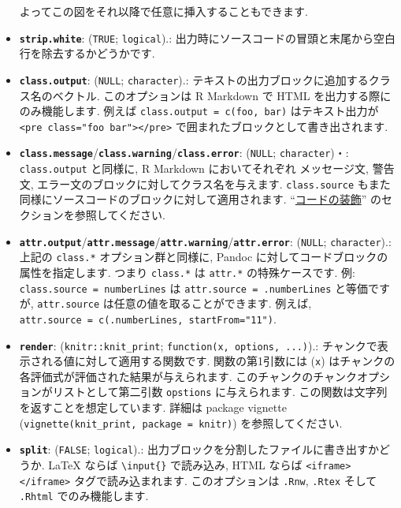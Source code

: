 \documentclass[
]{bxjsreport}
\begin{document}
\begin{itemize}
  よってこの図をそれ以降で任意に挿入することもできます.
\item
  \textbf{\texttt{strip.white}}: (\texttt{TRUE}; \texttt{logical}).:
  出力時にソースコードの冒頭と末尾から空白行を除去するかどうかです.
\item
  \textbf{\texttt{class.output}}: (\texttt{NULL}; \texttt{character}).:
  テキストの出力ブロックに追加するクラス名のベクトル. このオプションは R
  Markdown で HTML を出力する際にのみ機能します. 例えば
  \texttt{class.output\ =\ c(\textquotesingle{}foo\textquotesingle{},\ \textquotesingle{}bar\textquotesingle{})}
  はテキスト出力が
  \texttt{\textless{}pre\ class="foo\ bar"\textgreater{}\textless{}/pre\textgreater{}}
  で囲まれたブロックとして書き出されます.
\item
  \textbf{\texttt{class.message}}/\textbf{\texttt{class.warning}}/\textbf{\texttt{class.error}}:
  (\texttt{NULL}; \texttt{character})・: \texttt{class.output} と同様に,
  R Markdown においてそれぞれ メッセージ文, 警告文,
  エラー文のブロックに対してクラス名を与えます. \texttt{class.source}
  もまた同様にソースコードのブロックに対して適用されます.
  ``\protect\hyperlink{code-decoration}{コードの装飾}''
  のセクションを参照してください.
\item
  \textbf{\texttt{attr.output}}/\textbf{\texttt{attr.message}}/\textbf{\texttt{attr.warning}}/\textbf{\texttt{attr.error}}:
  (\texttt{NULL}; \texttt{character}).: 上記の \texttt{class.*}
  オプション群と同様に, Pandoc に対してコードブロックの属性を指定します.
  つまり \texttt{class.*} は \texttt{attr.*} の特殊ケースです. 例:
  \texttt{class.source\ =\ \textquotesingle{}numberLines\textquotesingle{}}
  は
  \texttt{attr.source\ =\ \textquotesingle{}.numberLines\textquotesingle{}}
  と等価ですが, \texttt{attr.source} は任意の値を取ることができます.
  例えば,
  \texttt{attr.source\ =\ c(\textquotesingle{}.numberLines\textquotesingle{},\ \textquotesingle{}startFrom="11"\textquotesingle{})}.
\item
  \textbf{\texttt{render}}: (\texttt{knitr::knit\_print};
  \texttt{function(x,\ options,\ ...)}).:
  チャンクで表示される値に対して適用する関数です. 関数の第1引数には
  (\texttt{x}) はチャンクの各評価式が評価された結果が与えられます.
  このチャンクのチャンクオプションがリストとして第二引数
  \texttt{opstions} に与えられます.
  この関数は文字列を返すことを想定しています. 詳細は package vignette
  (\texttt{vignette(\textquotesingle{}knit\_print\textquotesingle{},\ package\ =\ \textquotesingle{}knitr\textquotesingle{})})
  を参照してください.
\item
  \textbf{\texttt{split}}: (\texttt{FALSE}; \texttt{logical}).:
  出力ブロックを分割したファイルに書き出すかどうか. LaTeX ならば
  \texttt{\textbackslash{}input\{\}} で読み込み, HTML ならば
  \texttt{\textless{}iframe\textgreater{}\textless{}/iframe\textgreater{}}
  タグで読み込まれます. このオプションは \texttt{.Rnw}, \texttt{.Rtex}
  そして \texttt{.Rhtml} でのみ機能します.
\end{itemize}
\end{document}
